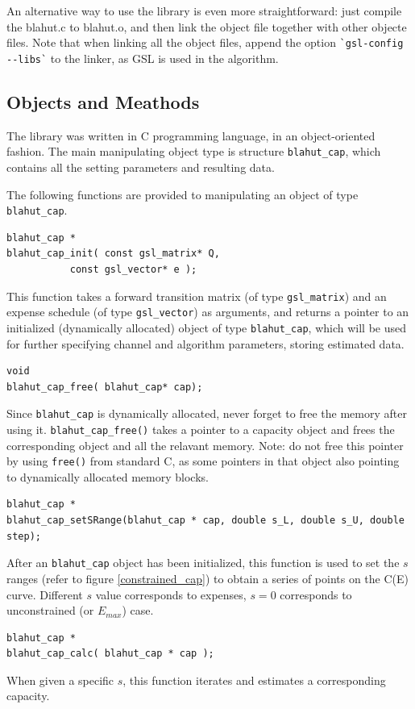 \documentclass[a4paper,10pt]{article}
\begin{document}
An alternative way to use the library is even more straightforward: just compile the blahut.c to blahut.o, and then link the object file together with other objecte files. Note that when linking all the object files, append the option \verb|`gsl-config --libs`| to the linker, as GSL is used in the algorithm.

\subsection{Objects and Meathods}
The library was written in C programming language, in an object-oriented fashion. The main manipulating object type is structure \verb|blahut_cap|, which contains all the setting parameters and resulting data.

The following functions are provided to manipulating an object of type \verb|blahut_cap|.
\begin{verbatim}
blahut_cap * 
blahut_cap_init( const gsl_matrix* Q, 
		   const gsl_vector* e );
\end{verbatim}
This function takes a forward transition matrix (of type \verb|gsl_matrix|) and an expense schedule (of type \verb|gsl_vector|) as arguments, and returns a pointer to an initialized (dynamically allocated) object of type \verb|blahut_cap|, which will be used for further specifying channel and algorithm parameters, storing estimated data.

\begin{verbatim}
void 
blahut_cap_free( blahut_cap* cap);
\end{verbatim}
Since \verb|blahut_cap| is dynamically allocated, never forget to free the memory after using it. \verb|blahut_cap_free()| takes a pointer to a capacity object and frees the corresponding object and all the relavant memory.
Note: do not free this pointer by using \verb|free()| from standard C, as some pointers in that object also pointing to dynamically allocated memory blocks.

\begin{verbatim}
blahut_cap * 
blahut_cap_setSRange(blahut_cap * cap, double s_L, double s_U, double step);
\end{verbatim}
After an \verb|blahut_cap| object has been initialized, this function is used to set the $s$ ranges (refer to figure \ref{constrained_cap}) to obtain a series of points on the C(E) curve. Different $s$ value corresponds to expenses, $s=0$ corresponds to unconstrained (or $E_{max}$) case.

\begin{verbatim}
blahut_cap *
blahut_cap_calc( blahut_cap * cap );
\end{verbatim}
When given a specific $s$, this function iterates and estimates a corresponding capacity.
\end{document}
